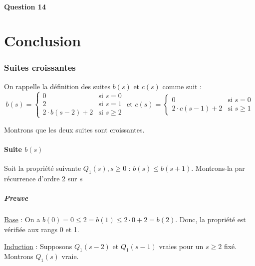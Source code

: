 \documentclass[12pt,a4paper]{article}
\begin{document}
 \subsection*{Question 14}
 

\newpage

\part*{Conclusion}


\newpage
\begin{appendices}
 \section{Suites croissantes}
 \label{appendix:suites}
 On rappelle la d\'efinition des suites $b(s)$ et $c(s)$ comme suit :
\begin{equation*}
\left .b(s) = \begin{cases} 
      0 & \text{si } s = 0 \\
      2 & \text{si } s = 1 \\
      2\cdot b(s-2) + 2 & \text{si } s\geq 2 
   \end{cases} \right.
   \text{ et }
\left .c(s) = \begin{cases} 
      0 & \text{si } s = 0 \\
      2\cdot c(s-1) + 2 & \text{si } s\geq 1 
   \end{cases} \right.
\end{equation*}

Montrons que les deux suites sont croissantes.

\subsection*{Suite $b(s)$}
Soit la propri\'et\'e suivante $Q_{1}(s), s \geq 0$ : $b(s) \leq b(s+1)$.
Montrons-la par r\'ecurrence d'ordre 2 sur $s$

\subsubsection*{Preuve}
\underline{Base} : On a $b(0) = 0 \leq 2 = b(1) \leq 2\cdot 0 + 2 = b(2)$. 
Donc, la propri\'et\'e est v\'erifi\'ee aux rangs 0 et 1.

\medskip
\underline{Induction} : Supposons $Q_{1}(s-2)$ et $Q_{1}(s-1)$ vraies pour un $s \geq 2$ fix\'e. 
Montrons $Q_{1}(s)$ vraie.


\end{appendices}
\end{document}
